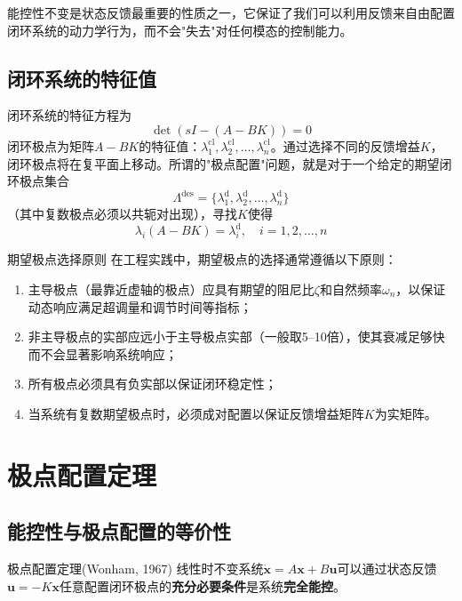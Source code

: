 \begin{remark}
能控性不变是状态反馈最重要的性质之一，它保证了我们可以利用反馈来自由配置闭环系统的动力学行为，而不会"失去"对任何模态的控制能力。
\end{remark}

\subsection{闭环系统的特征值}

闭环系统的特征方程为
\[
\det(sI - (A - BK)) = 0
\]
闭环极点为矩阵$A-BK$的特征值：$\lambda_1^{\mathrm{cl}}, \lambda_2^{\mathrm{cl}}, \dots, \lambda_n^{\mathrm{cl}}$。通过选择不同的反馈增益$K$，闭环极点将在复平面上移动。所谓的"极点配置"问题，就是对于一个给定的期望闭环极点集合
\[
\Lambda^{\mathrm{des}} = \{\lambda_1^{\mathrm{d}}, \lambda_2^{\mathrm{d}}, \dots, \lambda_n^{\mathrm{d}}\}
\]
（其中复数极点必须以共轭对出现），寻找$K$使得
\[
\lambda_i(A - BK) = \lambda_i^{\mathrm{d}}, \quad i = 1, 2, \dots, n
\]

\begin{mydefinition}{期望极点选择原则}
在工程实践中，期望极点的选择通常遵循以下原则：
\begin{enumerate}
\item 主导极点（最靠近虚轴的极点）应具有期望的阻尼比$\zeta$和自然频率$\omega_n$，以保证动态响应满足超调量和调节时间等指标；
\item 非主导极点的实部应远小于主导极点实部（一般取5--10倍），使其衰减足够快而不会显著影响系统响应；
\item 所有极点必须具有负实部以保证闭环稳定性；
\item 当系统有复数期望极点时，必须成对配置以保证反馈增益矩阵$K$为实矩阵。
\end{enumerate}
\end{mydefinition}

\section{极点配置定理}

\subsection{能控性与极点配置的等价性}

\begin{myTheorem}{极点配置定理{(Wonham, 1967)}}
线性时不变系统$\dot{\mathbf{x}} = A\mathbf{x} + B\mathbf{u}$可以通过状态反馈$\mathbf{u} = -K\mathbf{x}$任意配置闭环极点的\textbf{充分必要条件}是系统\textbf{完全能控}。
\end{myTheorem}

